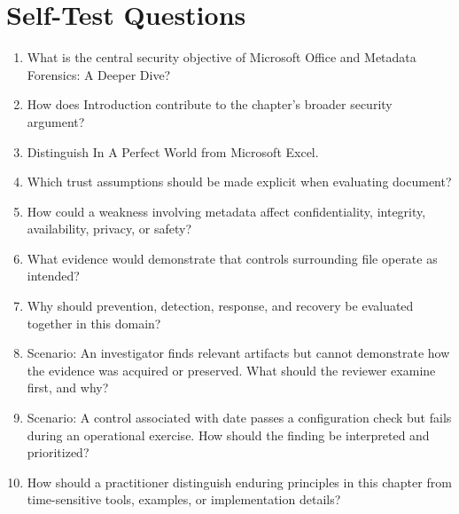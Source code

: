 \documentclass[11pt]{article}
\begin{document}
\section*{Self-Test Questions}
\begin{enumerate}
\item What is the central security objective of Microsoft Office and Metadata Forensics: A Deeper Dive?
\item How does Introduction contribute to the chapter's broader security argument?
\item Distinguish In A Perfect World from Microsoft Excel.
\item Which trust assumptions should be made explicit when evaluating document?
\item How could a weakness involving metadata affect confidentiality, integrity, availability, privacy, or safety?
\item What evidence would demonstrate that controls surrounding file operate as intended?
\item Why should prevention, detection, response, and recovery be evaluated together in this domain?
\item Scenario: An investigator finds relevant artifacts but cannot demonstrate how the evidence was acquired or preserved. What should the reviewer examine first, and why?
\item Scenario: A control associated with date passes a configuration check but fails during an operational exercise. How should the finding be interpreted and prioritized?
\item How should a practitioner distinguish enduring principles in this chapter from time-sensitive tools, examples, or implementation details?
\end{enumerate}
\end{document}
